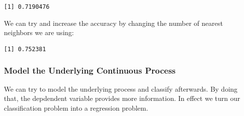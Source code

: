 \documentclass[]{article}
\newenvironment{Shaded}{\begin{snugshade}}{\end{snugshade}}
\newcommand{\CommentTok}[1]{\textcolor[rgb]{0.56,0.35,0.01}{\textit{#1}}}
\newcommand{\DataTypeTok}[1]{\textcolor[rgb]{0.13,0.29,0.53}{#1}}
\newcommand{\DecValTok}[1]{\textcolor[rgb]{0.00,0.00,0.81}{#1}}
\newcommand{\KeywordTok}[1]{\textcolor[rgb]{0.13,0.29,0.53}{\textbf{#1}}}
\newcommand{\NormalTok}[1]{#1}
\newcommand{\OperatorTok}[1]{\textcolor[rgb]{0.81,0.36,0.00}{\textbf{#1}}}
\newcommand{\StringTok}[1]{\textcolor[rgb]{0.31,0.60,0.02}{#1}}
\begin{document}
\begin{Shaded}
\end{Shaded}

\begin{verbatim}
[1] 0.7190476
\end{verbatim}

We can try and increase the accuracy by changing the number of nearest neighbors we are using:

\begin{Shaded}
\end{Shaded}

\begin{verbatim}
[1] 0.752381
\end{verbatim}

\hypertarget{model-the-underlying-continuous-process}{%
\subsubsection{Model the Underlying Continuous Process}\label{model-the-underlying-continuous-process}}

We can try to model the underlying process and classify afterwards. By doing that, the depdendent variable provides more information. In effect we turn our classification problem into a regression problem.
\end{document}
